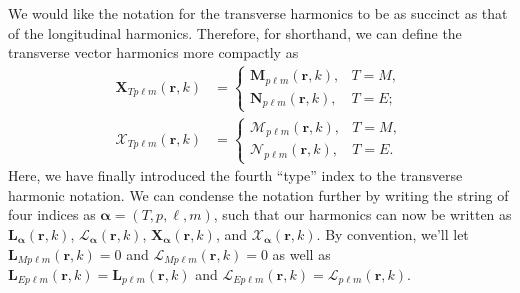 \documentclass{article}
\begin{document}
We would like the notation for the transverse harmonics to be as succinct as that of the longitudinal harmonics. Therefore, for shorthand, we can define the transverse vector harmonics more compactly as
\begin{equation}
\begin{split}
\mathbf{X}_{Tp\ell m}(\mathbf{r},k) &= 
\begin{cases}
\mathbf{M}_{p\ell m}(\mathbf{r},k), & T=M,\\
\mathbf{N}_{p\ell m}(\mathbf{r},k), & T=E;
\end{cases}\\[1.0em]
\bm{\mathcal{X}}_{Tp\ell m}(\mathbf{r},k) &=
\begin{cases}
\bm{\mathcal{M}}_{p\ell m}(\mathbf{r},k), & T=M,\\
\bm{\mathcal{N}}_{p\ell m}(\mathbf{r},k), & T=E.
\end{cases}
\end{split}
\end{equation}
Here, we have finally introduced the fourth ``type'' index to the transverse harmonic notation. We can condense the notation further by writing the string of four indices as $\bm{\alpha} = (T,p,\ell,m)$, such that our harmonics can now be written as $\mathbf{L}_{\bm{\alpha}}(\mathbf{r},k)$, $\bm{\mathcal{L}}_{\bm{\alpha}}(\mathbf{r},k)$, $\mathbf{X}_{\bm{\alpha}}(\mathbf{r},k)$, and $\bm{\mathcal{X}}_{\bm{\alpha}}(\mathbf{r},k)$. By convention, we'll let $\mathbf{L}_{Mp\ell m}(\mathbf{r},k) = 0$ and $\bm{\mathcal{L}}_{Mp\ell m}(\mathbf{r},k) = 0$ as well as $\mathbf{L}_{Ep\ell m}(\mathbf{r},k) = \mathbf{L}_{p\ell m}(\mathbf{r},k)$ and $\bm{\mathcal{L}}_{Ep\ell m}(\mathbf{r},k) = \bm{\mathcal{L}}_{p\ell m}(\mathbf{r},k)$.
\end{document}
